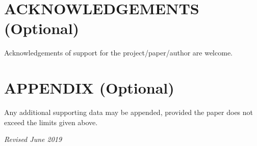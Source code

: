 \documentclass{isprs} %
\begin{document}
\section*{ACKNOWLEDGEMENTS (Optional)}\label{ACKNOWLEDGEMENTS}
Acknowledgements of support for the project/paper/author are welcome. 

{
	\begin{spacing}{1.17}
		\normalsize
	\end{spacing}
}


\section*{APPENDIX (Optional)}\label{APPENDIX}

Any additional supporting data may be appended, provided the paper does not exceed the limits given above. 

\vspace{1cm}
\textit{Revised June 2019}
\end{document}
